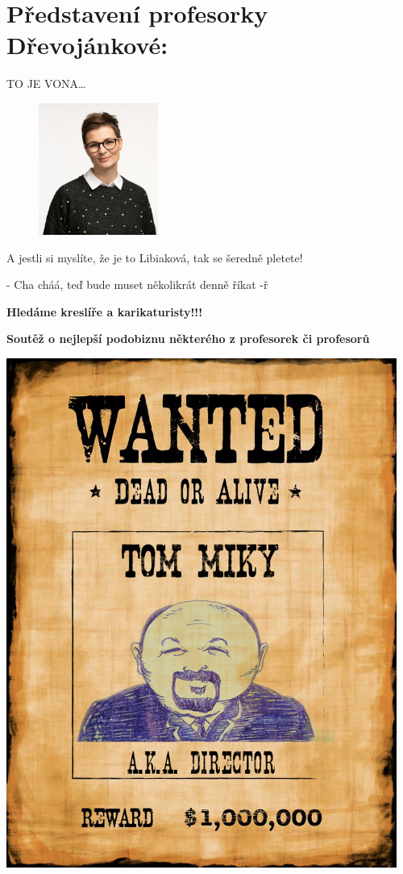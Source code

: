 \documentclass[twoside, 11pt]{article}
\begin{document}
\section*{Představení profesorky Dřevojánkové:}
TO JE VONA\dots \\
\begin{figure}
    \vspace*{-52pt}
    \includegraphics[width=0.35\textwidth]{libiak}
\end{figure}

A jestli si myslíte, že je to Libiaková, tak se šeredně pletete!
\vfill
\begin{flushright}
    - Cha cháá, teď bude muset několikrát denně říkat -ř  
\end{flushright}

\clearpage

\begin{center}
    \Large \textbf{Hledáme kreslíře a karikaturisty!!!}
\end{center}

\begin{center}
    \Large \textbf{Soutěž o nejlepší podobiznu některého z profesorek či profesorů}
\end{center}
\centering
\includegraphics[width=0.96\textwidth]{wanted}

\end{document}
